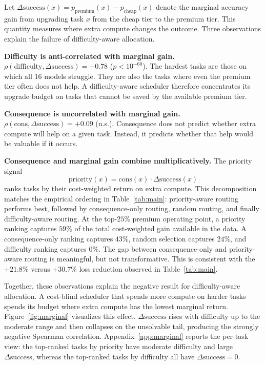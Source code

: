\documentclass{article}
\begin{document}
Let $\Delta\mathrm{success}(x) = p_{\mathrm{premium}}(x) -
p_{\mathrm{cheap}}(x)$ denote the marginal accuracy gain from upgrading
task $x$ from the cheap tier to the premium tier. This quantity
measures where extra compute changes the outcome. Three observations
explain the failure of difficulty-aware allocation.

\textbf{Difficulty is anti-correlated with marginal gain.}
\(\rho(\mathrm{difficulty}, \Delta\mathrm{success}) = -0.78\)
($p < 10^{-60}$). The hardest tasks are those on which all 16 models
struggle. They are also the tasks where even the premium tier often
does not help. A difficulty-aware scheduler therefore concentrates its
upgrade budget on tasks that cannot be saved by the available premium
tier.

\textbf{Consequence is uncorrelated with marginal gain.}
\(\rho(\mathrm{cons}, \Delta\mathrm{success}) = +0.09\) (n.s.).
Consequence does not predict whether extra compute will help on a
given task. Instead, it predicts whether that help would be valuable
if it occurs.

\textbf{Consequence and marginal gain combine multiplicatively.}
The priority signal
\[
\mathrm{priority}(x)
=
\mathrm{cons}(x)\cdot\Delta\mathrm{success}(x)
\]
ranks tasks by their cost-weighted return on extra compute. This
decomposition matches the empirical ordering in Table~\ref{tab:main}:
priority-aware routing performs best, followed by consequence-only
routing, random routing, and finally difficulty-aware routing. At the
top-$25\%$ premium operating point, a priority ranking captures
$59\%$ of the total cost-weighted gain available in the data. A
consequence-only ranking captures $43\%$, random selection captures
$24\%$, and difficulty ranking captures $0\%$. The gap between
consequence-only and priority-aware routing is meaningful, but not
transformative. This is consistent with the $+21.8\%$ versus
$+30.7\%$ loss reduction observed in Table~\ref{tab:main}.

Together, these observations explain the negative result for
difficulty-aware allocation. A cost-blind scheduler that spends more
compute on harder tasks spends its budget where extra compute has the
lowest marginal return. Figure~\ref{fig:marginal} visualizes this
effect. $\Delta\mathrm{success}$ rises with difficulty up to the
moderate range and then collapses on the unsolvable tail, producing the strongly negative Spearman correlation. Appendix~\ref{app:marginal} reports the per-task view: the top-ranked tasks by priority have moderate difficulty and large $\Delta\mathrm{success}$, whereas the
top-ranked tasks by difficulty all have $\Delta\mathrm{success}=0$.
\end{document}
